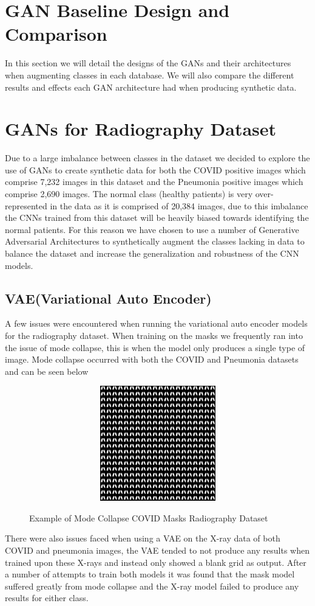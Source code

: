 \section{GAN Baseline Design and Comparison}
In this section we will detail the designs of the GANs and their architectures when augmenting classes in each database.  We will also compare the different results and effects each GAN architecture had when producing synthetic data.
\section{GANs for Radiography Dataset}
Due to a large imbalance between classes in the dataset we decided to explore the use of GANs to create synthetic data for both the COVID positive images which comprise 7,232 images in this dataset and the Pneumonia positive images which comprise 2,690 images.  The normal class (healthy patients) is very over-represented in the data as it is comprised of 20,384 images, due to this imbalance the CNNs trained from this dataset will be heavily biased towards identifying the normal patients.  For this reason we have chosen to use a number of Generative Adversarial Architectures to synthetically augment the classes lacking in data to balance the dataset and increase the generalization and robustness of the CNN models.
\subsection{VAE(Variational Auto Encoder)}
A few issues were encountered when running the variational auto encoder models for the radiography dataset.  When training on the masks we frequently ran into the issue of mode collapse, this is when the model only produces a single type of image.  Mode collapse occurred with both the COVID and Pneumonia datasets and can be seen below
 \begin{figure}[H]
    \centering
    \includegraphics[width=1\textwidth,height=5cm,keepaspectratio]{Images/LatentSpace2VAECOVIDMask30Epochs.png}\\
    \caption{Example of Mode Collapse COVID Masks Radiography Dataset}
    \label{fig:Example of Mode Collapse COVID Masks Radiography Dataset}
\end{figure}
There were also issues faced when using a VAE on the X-ray data of both COVID and pneumonia images, the VAE tended to not produce any results when trained upon these X-rays and instead only showed a blank grid as output.  After a number of attempts to train both models it was found that the mask model suffered greatly from mode collapse and the X-ray model failed to produce any results for either class.
